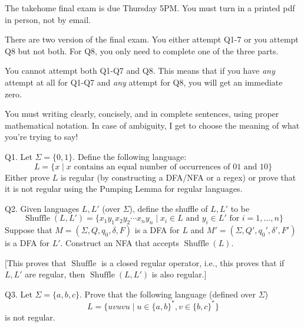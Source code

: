 



\renewcommand\TITLE{Final Exam}
\renewcommand\AUTHOR{John Doe}
\renewcommand\EMAIL{jdoe@jdoe.com}


\topmatter

The takehome final exam 
is due Thursday 5PM.
You must turn in a printed pdf in person, not by email.

There are two version of the final exam.
You either attempt Q1-7 or you attempt Q8 but not both.
For Q8, you only need to complete one of the three parts.

You cannot attempt both Q1-Q7 and Q8.
This means that if you have \textit{any} attempt at all for Q1-Q7 
and \textit{any} attempt for Q8, you will get an immediate zero. 

You must writing clearly, concisely, and in complete sentences, using
proper mathematical notation.
In case of ambiguity, I get to choose the meaning of what you're trying to 
say!




\newpage
Q1. Let $\Sigma = \{0,1\}$. Define the following language:
\[
L = 
\{
x \mid
x \text{ contains an equal number of occurrences of $01$ and $10$}
\}
\] 
Either prove $L$ is regular (by constructing a DFA/NFA or a regex) or
prove that it is not regular using the Pumping Lemma for regular languages.

\SOLUTION






\newpage
\newcommand\shuffle{\operatorname{Shuffle}}

Q2. Given languages $L, L'$ (over $\Sigma$), 
define the shuffle of $L,L'$ to be
\[
\shuffle(L,L') = \{x_1 y_1 x_2 y_2 \cdots x_n y_n \mid 
x_i \in L \text{ and } 
y_i \in L' 
\text{ for } i=1,\ldots,n 
\}
\]
Suppose that 
$M = (\Sigma, Q, q_0, \delta, F)$ is a DFA for $L$ and
$M' = (\Sigma, Q', q_0', \delta', F')$ is a DFA for $L'$.
Construct an NFA that accepts $\shuffle(L)$.

[This proves that $\shuffle$ is a closed regular operator, i.e.,
this proves that if $L,L'$ are regular, then 
$\shuffle(L,L')$ is also regular.]


\SOLUTION






\newpage
Q3. Let $\Sigma = \{a,b,c\}$.
Prove that the following language (defined over $\Sigma$)
\[
L = 
\{
uvuvu \mid
u \in \{a,b\}^*, v \in \{b,c\}^*
\}
\]
is not regular.


